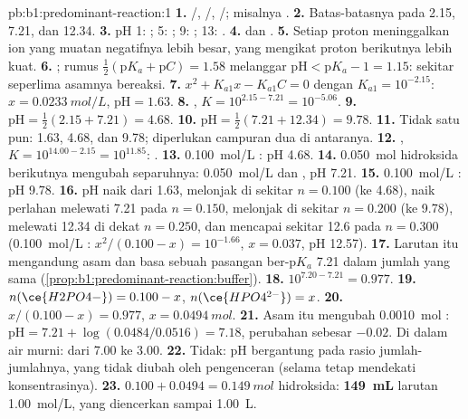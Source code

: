 \begin{solution}{pb:b1:predominant-reaction:1}
\textbf{1.} /, /,
/; misalnya .
\textbf{2.} Batas-batasnya pada 2.15, 7.21, dan 12.34.
\textbf{3.} pH 1: ; 5: ; 9: ; 13:
.
\textbf{4.}  dan .
\textbf{5.} Setiap proton meninggalkan ion yang muatan negatifnya lebih
besar, yang mengikat proton berikutnya lebih kuat.
\textbf{6.} ; rumus
$\frac12(\mathrm{p}K_a + \mathrm{p}C) = 1.58$ melanggar $\mathrm{pH} <
\mathrm{p}K_a - 1 = 1.15$: sekitar seperlima asamnya bereaksi.
\textbf{7.} $x^2 + K_{a1}x - K_{a1}C = 0$ dengan $K_{a1} = 10^{-2.15}$: $x =
\qty{0.0233}{mol/L}$, $\mathrm{pH} = 1.63$.
\textbf{8.} , $K = 10^{2.15 - 7.21} =
10^{-5.06}$.
\textbf{9.} $\mathrm{pH} = \frac12(2.15 + 7.21) = 4.68$.
\textbf{10.} $\mathrm{pH} = \frac12(7.21 + 12.34) = 9.78$.
\textbf{11.} Tidak satu pun: 1.63, 4.68, dan 9.78; diperlukan campuran
dua di antaranya.
\textbf{12.} , $K = 10^{14.00 - 2.15} =
10^{11.85}$: .
\textbf{13.} \qty{0.100}{mol/L} : pH 4.68.
\textbf{14.} \qty{0.050}{mol} hidroksida berikutnya mengubah separuhnya:
\qty{0.050}{mol/L}  dan , pH 7.21.
\textbf{15.} \qty{0.100}{mol/L} : pH 9.78.
\textbf{16.} pH naik dari 1.63, melonjak di sekitar $n = 0.100$ (ke 4.68),
naik perlahan melewati 7.21 pada $n = 0.150$, melonjak di sekitar
$n = 0.200$ (ke 9.78), melewati 12.34 di dekat $n = 0.250$, dan mencapai
sekitar 12.6 pada $n = 0.300$ (\qty{0.100}{mol/L} : $x^2/(0.100 - x) = 10^{-1.66}$, $x = 0.037$, pH 12.57).
\textbf{17.} Larutan itu mengandung asam dan basa sebuah pasangan
ber-$\mathrm{p}K_a$ 7.21 dalam jumlah yang sama
(\cref{prop:b1:predominant-reaction:buffer}).
\textbf{18.} $10^{7.20 - 7.21} = 0.977$.
\textbf{19.} $n(\ce{H2PO4-}) = 0.100 - x$, $n(\ce{HPO4^{2-}}) = x$.
\textbf{20.} $x/(0.100 - x) = 0.977$, $x = \qty{0.0494}{mol}$.
\textbf{21.} Asam itu mengubah \qty{0.0010}{mol} :
$\mathrm{pH} = 7.21 + \log(0.0484/0.0516) = 7.18$, perubahan sebesar
$-0.02$. Di dalam air murni: dari 7.00 ke 3.00.
\textbf{22.} Tidak: pH bergantung pada rasio jumlah-jumlahnya, yang tidak
diubah oleh pengenceran (selama  tetap mendekati
konsentrasinya).
\textbf{23.} $0.100 + 0.0494 = \qty{0.149}{mol}$ hidroksida:
\textbf{\qty{149}{mL}} larutan \qty{1.00}{mol/L}, yang diencerkan
sampai \qty{1.00}{L}.
\end{solution}
